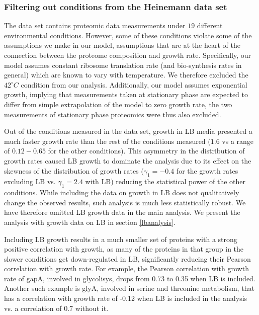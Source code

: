 \documentclass[a4paper]{article}
\newcommand{\hConds}{$19$}
\begin{document}
\subsubsection{Filtering out conditions from the Heinemann data set}
\label{heinemanncond} 

The \cite{Heinemann2015} data set contains proteomic data measurements under \hConds{} different environmental conditions.
However, some of these conditions violate some of the assumptions we make in our model, assumptions that are at the heart of the connection between the proteome composition and growth rate.
Specifically, our model assumes constant ribosome translation rate (and bio-synthesis rates in general) which are known to vary with temperature.
We therefore excluded the $42^\circ C$ condition from our analysis.
Additionally, our model assumes exponential growth, implying that measurements taken at stationary phase are expected to differ from simple extrapolation of the model to zero growth rate, the two measurements of stationary phase proteomics were thus also excluded.

Out of the conditions measured in the \cite{Heinemann2015} data set, growth in LB media presented a much faster growth rate than the rest of the conditions measured ($1.6$ vs a range of $0.12-0.65$ for the other conditions).
This asymmetry in the distribution of growth rates caused LB growth to dominate the analysis due to its effect on the skewness of the distribution of growth rates ($\gamma_1=-0.4$ for the growth rates excluding LB vs. $\gamma_1=2.4$ with LB) reducing the statistical power of the other conditions.
While including the data on growth in LB does not qualitatively change the observed results, such analysis is much less statistically robust.
We have therefore omitted LB growth data in the main analysis.
We present the analysis with growth data on LB in section \ref{lbanalysis}.

Including LB growth results in a much smaller set of proteins with a strong positive correlation with growth, as many of the proteins in that group in the slower conditions get down-regulated in LB, significantly reducing their Pearson correlation with growth rate.
For example, the Pearson correlation with growth rate of gapA, involved in glycolisys, drops from 0.73 to 0.35 when LB is included.
Another such example is glyA, involved in serine and threonine metabolism, that has a correlation with
growth rate of -0.12 when LB is included in the analysis vs. a correlation of 0.7 without it.
\end{document}
